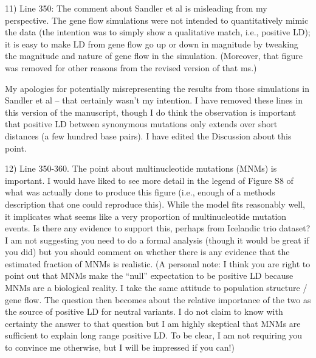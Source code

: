 \documentclass{article}
\newenvironment{response}%
  {\list{}{\leftmargin=0.5in\rightmargin=0.5in\color{blue}}\item[]}%
  {\endlist}
\begin{document}
11) Line 350: The comment about Sandler et al is misleading from my
perspective. The gene flow simulations were not intended to quantitatively
mimic the data (the intention was to simply show a qualitative match, i.e.,
positive LD); it is easy to make LD from gene flow go up or down in magnitude
by tweaking the magnitude and nature of gene flow in the simulation. (Moreover,
that figure was removed for other reasons from the revised version of that ms.)

\begin{response}
    My apologies for potentially misrepresenting the results from those simulations
    in Sandler et al -- that certainly wasn't my intention. I have removed these
    lines in this version of the manuscript, though I do think the observation is
    important that positive LD between synonymous mutations only extends over short
    distances (a few hundred base pairs). I have edited the Discussion about this point.
\end{response}

12) Line 350-360. The point about multinucleotide mutations (MNMs) is
important. I would have liked to see more detail in the legend of Figure S8 of
what was actually done to produce this figure (i.e., enough of a methods
description that one could reproduce this). While the model fits reasonably
well, it implicates what seems like a very proportion of multinucleotide
mutation events. Is there any evidence to support this, perhaps from Icelandic
trio dataset? I am not suggesting you need to do a formal analysis (though it
would be great if you did) but you should comment on whether there is any
evidence that the estimated fraction of MNMs is realistic. (A personal note: I
think you are right to point out that MNMs make the ``null'' expectation to be
positive LD because MNMs are a biological reality. I take the same attitude to
population structure / gene flow. The question then becomes about the relative
importance of the two as the source of positive LD for neutral variants. I do
not claim to know with certainty the answer to that question but I am highly
skeptical that MNMs are sufficient to explain long range positive LD. To be
clear, I am not requiring you to convince me otherwise, but I will be impressed
if you can!)
\end{document}
